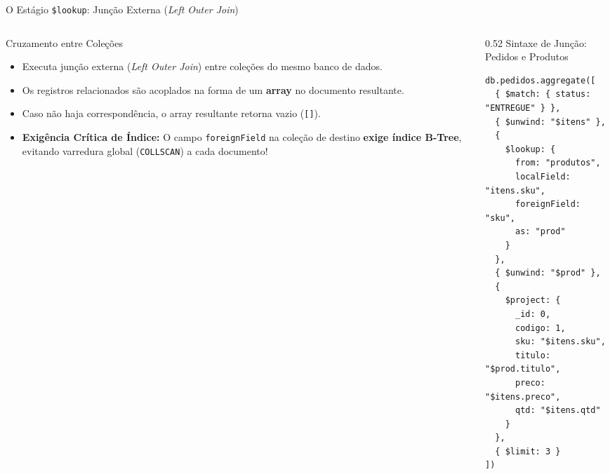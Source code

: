 \begin{frame}[fragile]{O Estágio \texttt{\$lookup}: Junção Externa (\textit{Left Outer Join})}
  \vspace{0.1cm}
  \begin{columns}[t,onlytextwidth]
    \begin{column}{0.46\textwidth}
      \alert{Cruzamento entre Coleções}\par
      \footnotesize
      \begin{itemize}
        \item Executa junção externa (\textit{Left Outer Join}) entre coleções do mesmo banco de dados.
        \item Os registros relacionados são acoplados na forma de um \textbf{array} no documento resultante.
        \item Caso não haja correspondência, o array resultante retorna vazio (\lstinline[language=mongosh, basicstyle=\footnotesize\ttfamily]|[]|).
        \item \textbf{Exigência Crítica de Índice:} O campo \lstinline[language=mongosh, basicstyle=\footnotesize\ttfamily]|foreignField| na coleção de destino \textbf{exige índice B-Tree}, evitando varredura global (\texttt{COLLSCAN}) a cada documento!
      \end{itemize}
    \end{column}
    \begin{column}{0.52\textwidth}
      \alert{Sintaxe de Junção: Pedidos e Produtos}\par
      \vspace{0.05cm}
      \begin{lstlisting}[language=mongosh, basicstyle=\fontsize{6.2pt}{6.9pt}\ttfamily]
db.pedidos.aggregate([
  { $match: { status: "ENTREGUE" } },
  { $unwind: "$itens" },
  {
    $lookup: {
      from: "produtos",
      localField: "itens.sku",
      foreignField: "sku",
      as: "prod"
    }
  },
  { $unwind: "$prod" },
  {
    $project: {
      _id: 0,
      codigo: 1,
      sku: "$itens.sku",
      titulo: "$prod.titulo",
      preco: "$itens.preco",
      qtd: "$itens.qtd"
    }
  },
  { $limit: 3 }
])
      \end{lstlisting}
    \end{column}
  \end{columns}
\end{frame}


